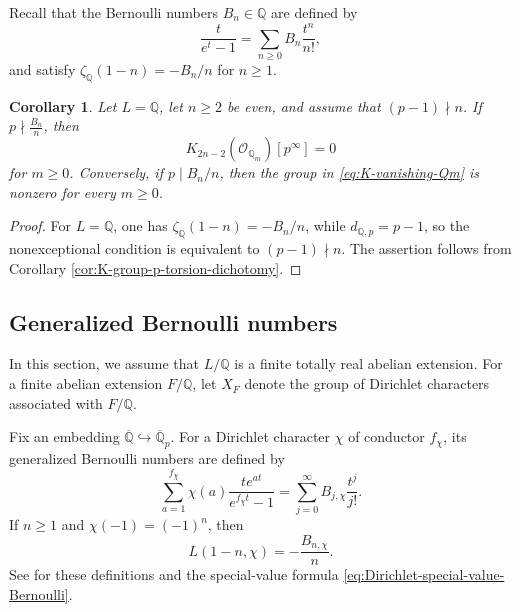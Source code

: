 \documentclass[11pt,table]{amsart}
\newtheorem{corollary}[theorem]{Corollary}
\newcommand{\Q}{\mathbb{Q}}
\numberwithin{equation}{section}
\begin{document}
Recall that the Bernoulli numbers $B_n\in\Q$ are defined by
\[
\frac{t}{e^t-1}=\sum_{n\geq 0}B_n\frac{t^n}{n!},
\]
and satisfy $\zeta_{\Q}(1-n)=-B_n/n$ for $n\geq 1$.
\begin{corollary}
\label{cor:K-groups-rational-base}
Let \(L=\mathbb Q\), let \(n\geq 2\) be even, and assume that
\((p-1)\nmid n\). If $p\nmid \frac{B_n}{n}$, then
\begin{equation}
        K_{2n-2}(\mathcal O_{\mathbb Q_m})[p^\infty]=0
        \label{eq:K-vanishing-Qm}
\end{equation}
for $m\geq 0$. Conversely, if \(p\mid B_n/n\), then the group in
\eqref{eq:K-vanishing-Qm} is nonzero for every \(m\geq 0\).
\end{corollary}

\begin{proof}
For \(L=\mathbb Q\), one has
\(\zeta_{\mathbb Q}(1-n)=-B_n/n\), while
\(d_{\mathbb Q,p}=p-1\), so the nonexceptional condition is equivalent
to \((p-1)\nmid n\). The assertion follows from Corollary
\ref{cor:K-group-p-torsion-dichotomy}.
\end{proof}

\subsection{Generalized Bernoulli numbers}
\label{subsec:generalized-Bernoulli-applications}

\par In this section, we assume that \(L/\mathbb Q\) is a finite totally real
abelian extension.  For a finite abelian extension \(F/\mathbb Q\),
let \(X_F\) denote the group of Dirichlet characters associated with
\(F/\mathbb Q\).

\par Fix an embedding
\(\overline{\mathbb Q}\hookrightarrow\overline{\mathbb Q}_p\).
For a Dirichlet character \(\chi\) of conductor \(f_\chi\), its
generalized Bernoulli numbers are defined by
\begin{equation}
        \sum_{a=1}^{f_\chi}
        \chi(a)\frac{te^{at}}{e^{f_\chi t}-1}
        =
        \sum_{j=0}^{\infty}
        B_{j,\chi}\frac{t^j}{j!}.
        \label{eq:generalized-Bernoulli-generating-series}
\end{equation}
If \(n\geq 1\) and \(\chi(-1)=(-1)^n\), then
\begin{equation}\label{eq:Dirichlet-special-value-Bernoulli}
        L(1-n,\chi)
        =
        -\frac{B_{n,\chi}}{n}.
\end{equation}
See \cite[Chapter~4, \S4.1]{Washington1997} for these definitions and
the special-value formula \eqref{eq:Dirichlet-special-value-Bernoulli}.
\end{document}
